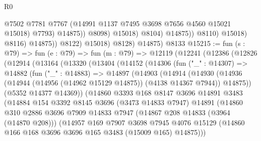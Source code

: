 \begin{lexlean}{R0}
\begin{coremodule}
                                      @7502
                                      @7781
                                      @7767
                                      (@14991 @1137 @7495 @3698 @7656 @4560 @15021 @15018)
                                      @7793)
                                    @14875))
                                @8098)
                              @15018)
                            @8104)
                          @14875))
                      @8110)
                    @15018)
                  @8116)
                @14875))
            @8122)
          @15018)
        @8128)
      @14875)
    @8133
@15215 := fun (s : @79) =>
  fun (e : @79) =>
  fun (m : @79) =>
  @12119
    (@12241
      (@12386
        (@12826
          (@12914
            (@13164
              (@13320
                (@13404
                  (@14152
                    (@14306
                      (fun ("_" : @14307) =>
                      @14882
                        (fun ("_" : @14883) =>
                        @14897
                          (@14903
                            (@14914
                              (@14930
                                (@14936
                                  (@14944 (@14956 (@14962 @15129 @14875)) (@4138 @14367 @7944))
                                  @14875))
                              (@5352 @14377 @14369))
                            (@14860
                              @3393
                              @168
                              @8147
                              @3696
                              @14891
                              @3483
                              (@14884
                                @154
                                @3392
                                @8145
                                @3696
                                (@3473 @14833 @7947)
                                @14891
                                (@14860
                                  @310
                                  @2886
                                  @3696
                                  @7909
                                  @14833
                                  @7947
                                  (@14867 @208 @14833 (@3964 (@14870 @208)))
                                  (@14957
                                    @169
                                    @7907
                                    @3698
                                    @7945
                                    @4076
                                    @15129
                                    (@14860 @166 @168 @3696 @3696 @165 @3483 (@15009 @165) @14875)))

\end{coremodule}
\end{lexlean}
